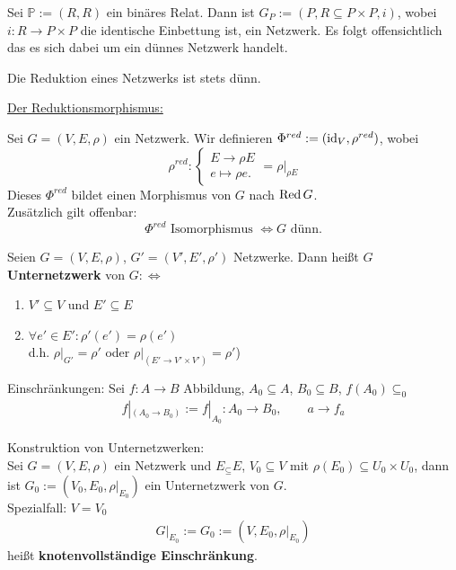 \begin{beispiel}
    Sei $\mathbb{P} := (R, R)$ ein binäres Relat.
    Dann ist $G_P := (P, R \subseteq P \times P, i)$, wobei
    $i: R \to P \times P$ die identische Einbettung ist,
    ein Netzwerk.
    Es folgt offensichtlich das es sich dabei um ein dünnes Netzwerk handelt.
\end{beispiel}

\begin{korollar}
    Die Reduktion eines Netzwerks ist stets dünn.
\end{korollar}

\begin{bemerkungnr}
    \underline{Der Reduktionsmorphismus:}

    Sei $G = (V, E, \rho)$ ein Netzwerk.
    Wir definieren $ \Phi^{red} := (\text{id}_V, \rho^{red})$, wobei
    $$ \rho^{red} : \begin{cases}
        E \to \rho E\\ 
        e\mapsto \rho e.\end{cases} = \rho|_{\rho E}$$
    Dieses $ \Phi^{red} $ bildet einen Morphismus von $G$ nach $\operatorname{Red} G$.\\
    Zusätzlich gilt offenbar:
    $$ \Phi^{red} \text{ Isomorphismus } \iff G \text{ dünn}.$$
\end{bemerkungnr}

\begin{definition}
Seien $G=(V,E,\rho)$, $G'=(V',E',\rho')$ Netzwerke. Dann heißt $G$ \textbf{Unternetzwerk} von $G:\Longleftrightarrow$
\begin{enumerate}
\item $V'\subseteq V$ und $E'\subseteq E$
\item $\forall e'\in E':\rho'(e')=\rho(e')$\\
d.h. $\rho|_{G'}=\rho'$ oder $\rho|_{(E'\to V'\times V')}=\rho'$)
\end{enumerate}
\end{definition}

\begin{notation}
Einschränkungen: Sei $f:A\to B$ Abbildung, $A_0\subseteq A$, $B_0\subseteq B$, $f(A_0)\subseteq_0$
\begin{align*}
f|_{(A_0\to B_0)}:=f|_{A_0}:A_0\to B_0,\qquad a\to f_a
\end{align*}
\end{notation}

Konstruktion von Unternetzwerken:\\
Sei $G=(V,E,\rho)$ ein Netzwerk und $E_\subseteq E$, $V_0\subseteq V$ mit $\rho(E_0)\subseteq U_0\times U_0$, dann ist $G_0:=(V_0,E_0,\rho|_{E_0})$ ein Unternetzwerk von $G$.\\
Spezialfall: $V=V_0$
\begin{align*}
G|_{E_0}:=G_0:=(V,E_0,\rho|_{E_0})
\end{align*}
heißt \textbf{knotenvollständige Einschränkung}.


